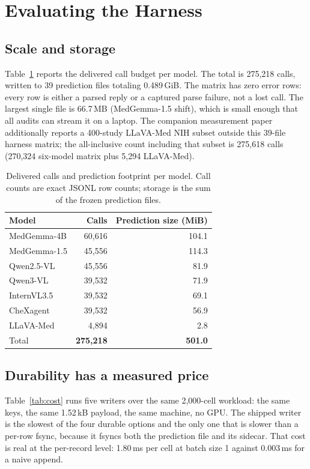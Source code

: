 \section{Evaluating the Harness}
\label{sec:evaluation}

\subsection{Scale and storage}

Table~\ref{tab:models_calls} reports the delivered call budget per model. The total is 275,218 calls, written to 39 prediction files totaling 0.489\,GiB. The matrix has zero error rows: every row is either a parsed reply or a captured parse failure, not a lost call. The largest single file is 66.7\,MB (MedGemma-1.5 shift), which is small enough that all audits can stream it on a laptop. The companion measurement paper additionally reports a 400-study LLaVA-Med NIH subset outside this 39-file harness matrix; the all-inclusive count including that subset is 275,618 calls (270,324 six-model matrix plus 5,294 LLaVA-Med).

\begin{table}[t]
\centering
\small
\caption{Delivered calls and prediction footprint per model. Call counts are exact JSONL row counts; storage is the sum of the frozen prediction files.}
\label{tab:models_calls}
\begin{tabular}{lrr}
\toprule
Model & Calls & Prediction size (MiB) \\
\midrule
MedGemma-4B & 60,616 & 104.1 \\
MedGemma-1.5 & 45,556 & 114.3 \\
Qwen2.5-VL & 45,556 & 81.9 \\
Qwen3-VL & 39,532 & 71.9 \\
InternVL3.5 & 39,532 & 69.1 \\
CheXagent & 39,532 & 56.9 \\
LLaVA-Med & 4,894 & 2.8 \\
\midrule
Total & \textbf{275,218} & \textbf{501.0} \\
\bottomrule
\end{tabular}
\end{table}

\subsection{Durability has a measured price}

Table~\ref{tab:cost} runs five writers over the same 2,000-cell workload: the same
keys, the same 1.52\,kB payload, the same machine, no GPU. The shipped writer is
the slowest of the four durable options and the only one that is slower than a
per-row fsync, because it fsyncs both the prediction file and its sidecar. That
cost is real at the per-record level: 1.80\,ms per cell at batch size 1 against
0.003\,ms for a naive append.

